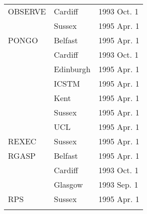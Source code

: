\begin{table}
\begin{center}
\begin{tabular}{|p{36mm}|p{50mm}|p{30mm}|}
OBSERVE                 & Cardiff          & 1993 Oct. 1 \\
                        & Sussex           & 1995 Apr. 1 \\
PONGO                   & Belfast          & 1995 Apr. 1 \\
                        & Cardiff          & 1993 Oct. 1 \\
                        & Edinburgh        & 1995 Apr. 1 \\
                        & ICSTM            & 1995 Apr. 1 \\
                        & Kent             & 1995 Apr. 1 \\
                        & Sussex           & 1995 Apr. 1 \\
                        & UCL              & 1995 Apr. 1 \\
REXEC                   & Sussex           & 1995 Apr. 1 \\
RGASP                   & Belfast          & 1995 Apr. 1 \\
                        & Cardiff          & 1993 Oct. 1 \\
                        & Glasgow          & 1993 Sep. 1 \\
RPS                     & Sussex           & 1995 Apr. 1 \\
& & \\ \hline                   
\end{tabular}
\end{center}
\end{table}

